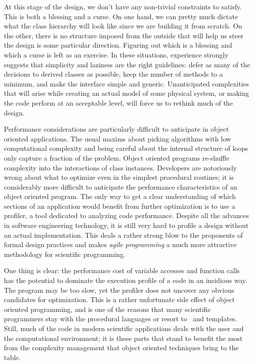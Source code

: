 At this stage of the design, we don't have any non-trivial constraints to satisfy. This is both
a blessing and a curse. On one hand, we can pretty much dictate what the class hierarchy will
look like since we are building it from scratch. On the other, there is no structure imposed
from the outside that will help us steer the design is some particular direction. Figuring out
which is a blessing and which a curse is left as an exercise. In these situations, experience
strongly suggests that simplicity and laziness are the right guidelines: defer as many of the
decisions to derived classes as possible, keep the number of methods to a minimum, and make the
interface simple and generic. Unanticipated complexities that will arise while creating an
actual model of some physical system, or making the code perform at an acceptable level, will
force us to rethink much of the design.

Performance considerations are particularly difficult to anticipate in object oriented
applications. The usual maxims about picking algorithms with low computational complexity and
being careful about the internal structure of loops only capture a fraction of the problem.
Object oriented programs re-shuffle complexity into the interactions of class instances.
Developers are notoriously wrong about what to optimize even in the simplest procedural
routines; it is considerably more difficult to anticipate the performance characteristics of an
object oriented program. The only way to get a clear understanding of which sections of an
application would benefit from further optimization is to use a profiler, a tool dedicated to
analyzing code performance. Despite all the advances in software engineering technology, it is
still very hard to profile a design without an actual implementation. This deals a rather
strong blow to the proponents of formal design practices\supercite{uml} and makes {\em agile
  programming}\supercite{agile} a much more attractive methodology for scientific programming.

One thing is clear: the performance cost of variable accesses and function calls has the
potential to dominate the execution profile of a code in an insidious way. The program may be
too slow, yet the profiler does not uncover any obvious candidates for optimization. This is a
rather unfortunate side effect of object oriented programming, and is one of the reasons that
many scientific programmers stay with the procedural languages or resort to \cpp\ and
templates. Still, much of the code in modern scientific applications deals with the user and
the computational environment; it is these parts that stand to benefit the most from the
complexity management that object oriented techniques bring to the table.

